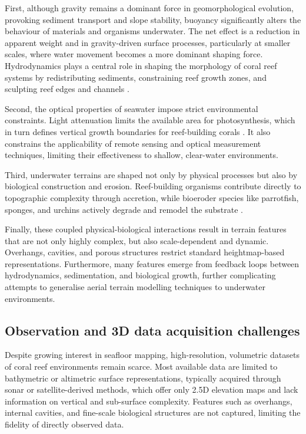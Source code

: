 First, although gravity remains a dominant force in geomorphological evolution, provoking sediment transport and slope stability, buoyancy significantly alters the behaviour of materials and organisms underwater. The net effect is a reduction in apparent weight and in gravity-driven surface processes, particularly at smaller scales, where water movement becomes a more dominant shaping force. Hydrodynamics plays a central role in shaping the morphology of coral reef systems by redistributing sediments, constraining reef growth zones, and sculpting reef edges and channels \cite{Lowe2015}.

Second, the optical properties of seawater impose strict environmental constraints. Light attenuation limits the available area for photosynthesis, which in turn defines vertical growth boundaries for reef-building corals \cite{Huston1985}. It also constrains the applicability of remote sensing and optical measurement techniques, limiting their effectiveness to shallow, clear-water environments.

Third, underwater terrains are shaped not only by physical processes but also by biological construction and erosion. Reef-building organisms contribute directly to topographic complexity through accretion, while bioeroder species like parrotfish, sponges, and urchins actively degrade and remodel the substrate \cite{Perry2013}.

Finally, these coupled physical-biological interactions result in terrain features that are not only highly complex, but also scale-dependent and dynamic. Overhangs, cavities, and porous structures restrict standard heightmap-based representations. Furthermore, many features emerge from feedback loops between hydrodynamics, sedimentation, and biological growth, further complicating attempts to generalise aerial terrain modelling techniques to underwater environments.


\subsection{Observation and 3D data acquisition challenges}
Despite growing interest in seafloor mapping, high-resolution, volumetric datasets of coral reef environments remain scarce. Most available data are limited to bathymetric or altimetric surface representations, typically acquired through sonar or satellite-derived methods, which offer only 2.5D elevation maps and lack information on vertical and sub-surface complexity. Features such as overhangs, internal cavities, and fine-scale biological structures are not captured, limiting the fidelity of directly observed data.

